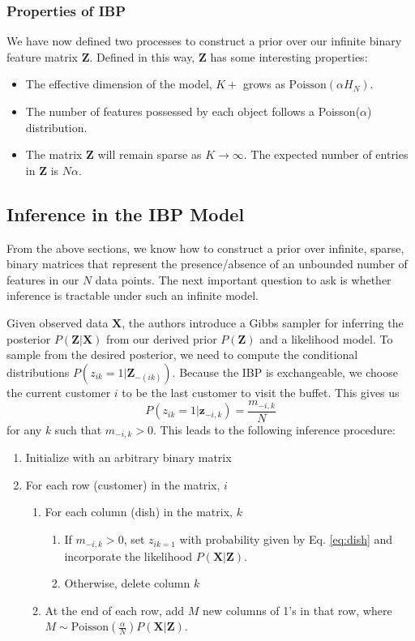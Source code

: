 \documentclass[twoside]{article}
\begin{document}
\subsubsection{Properties of IBP}
We have now defined two processes to construct a prior over our infinite binary feature matrix $\mathbf{Z}$. Defined in this way, $\mathbf{Z}$ has some interesting properties:
\begin{itemize}
    \item The effective dimension of the model, $K+$ grows as $\text{Poisson}(\alpha H_N)$.
    \item The number of features possessed by each object follows a Poisson($\alpha$) distribution.
    \item The matrix $\mathbf{Z}$ will remain sparse as $K \to \infty$. The expected number of entries in $\mathbf{Z}$ is $N\alpha$.
\end{itemize}

\subsection{Inference in the IBP Model}
\label{sec:gibbs}
From the above sections, we know how to construct a prior over infinite, sparse, binary matrices that represent the presence/absence of an unbounded number of features in our $N$ data points. The next important question to ask is whether inference is tractable under such an infinite model. 

Given observed data $\mathbf{X}$, the authors introduce a Gibbs sampler for inferring the posterior $P(\mathbf{Z | X})$ from our derived prior $P(\mathbf{Z})$ and a likelihood model. To sample from the desired posterior, we need to compute the conditional distributions $P(z_{ik} = 1| \mathbf{Z}_{-(ik)})$. Because the IBP is exchangeable, we choose the current customer $i$ to be the last customer to visit the buffet. This gives us
\begin{equation}
    P(z_{ik} = 1 | \mathbf{z}_{-i, k}) = \frac{m_{-i, k}}{N}
    \label{eq:dish}
\end{equation}
for any $k$ such that $m_{-i, k} > 0$. This leads to the following inference procedure:
\begin{enumerate}
  \item Initialize with an arbitrary binary matrix 
  \item For each row (customer) in the matrix, $i$ 
    \begin{enumerate}
        \item For each column (dish) in the matrix, $k$
            \begin{enumerate}
                \item If $m_{-i, k} > 0$,  set $z_{ik = 1}$ with probability given by Eq. \ref{eq:dish} and incorporate the likelihood $P(\mathbf{X|Z})$.
                \item Otherwise, delete column $k$
            \end{enumerate}
        \item At the end of each row, add $M$ new columns of 1's in that row, where $M \sim \text{Poisson}(\frac{\alpha}{N}) P(\mathbf{X|Z})$.
    \end{enumerate}
\end{enumerate}
\end{document}
